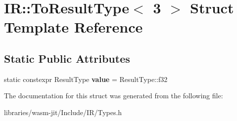 \hypertarget{struct_i_r_1_1_to_result_type_3_013_01_4}{}\section{IR\+:\+:To\+Result\+Type$<$ 3 $>$ Struct Template Reference}
\label{struct_i_r_1_1_to_result_type_3_013_01_4}
\subsection*{Static Public Attributes}
\begin{DoxyCompactItemize}
\item 
\mbox{\label{struct_i_r_1_1_to_result_type_3_013_01_4_a137f1ce95d885fe61a256715cb8c3af2}} 
static constexpr Result\+Type {\bfseries value} = Result\+Type\+::f32
\end{DoxyCompactItemize}


The documentation for this struct was generated from the following file\+:\begin{DoxyCompactItemize}
\item 
libraries/wasm-\/jit/\+Include/\+I\+R/Types.\+h\end{DoxyCompactItemize}
